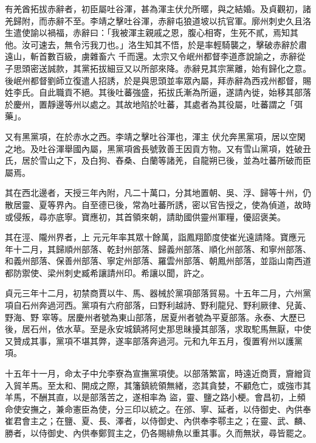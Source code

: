 \begin{pinyinscope}
 有羌酋拓拔赤辭者，初臣屬吐谷渾，甚為渾主伏允所暱，與之結婚。及貞觀初，諸羌歸附，而赤辭不至。李靖之擊吐谷渾，赤辭屯狼道坡以抗官軍。廓州刺史久且洛生遣使諭以禍福，赤辭曰：「我被渾主親戚之恩，腹心相寄，生死不貳，焉知其他。汝可速去，無令污我刀也。」洛生知其不悟，於是率輕騎襲之，擊破赤辭於肅遠山，斬首數百級，虜雜畜六
 千而還。太宗又令岷州都督李道彥說諭之，赤辭從子思頭密送誠款，其黨拓拔細豆又以所部來降。赤辭見其宗黨離，始有歸化之意。後岷州都督劉師立復遣人招誘，於是與思頭並率眾內屬，拜赤辭為西戎州都督，賜姓李氏。自此職貢不絕。其後吐蕃強盛，拓拔氏漸為所逼，遂請內徙，始移其部落於慶州，置靜邊等州以處之。其故地陷於吐蕃，其處者為其役屬，吐蕃謂之「弭藥」。



 又有黑黨項，在於赤水之西。李靖之擊吐谷渾也，渾主
 伏允奔黑黨項，居以空閑之地。及吐谷渾舉國內屬，黑黨項酋長號敦善王因貢方物。又有雪山黨項，姓破丑氏，居於雪山之下，及白狗、舂桑、白蘭等諸羌，自龍朔已後，並為吐蕃所破而臣屬焉。



 其在西北邊者，天授三年內附，凡二十萬口，分其地置朝、吳、浮、歸等十州，仍散居靈、夏等界內。自至德已後，常為吐蕃所誘，密以官告授之，使為偵道，故時或侵叛，尋亦底寧。寶應初，其首領來朝，請助國供靈州軍糧，優詔褒美。



 其在涇、隴州界者，上
 元元年率其眾十餘萬，詣鳳翔節度使崔光遠請降。寶應元年十二月，其歸順州部落、乾封州部落、歸義州部落、順化州部落、和寧州部落、和義州部落、保善州部落、寧定州部落、羅雲州部落、朝鳳州部落，並詣山南西道都防禦使、梁州刺史臧希讓請州印。希讓以聞，許之。



 貞元三年十二月，初禁商賈以牛、馬、器械於黨項部落貿易。十五年二月，六州黨項自石州奔過河西。黨項有六府部落，曰野利越詩、野利龍兒、野利厥律、兒黃、野海、野
 窣等。居慶州者號為東山部落，居夏州者號為平夏部落。永泰、大歷已後，居石州，依水草。至是永安城鎮將阿史那思昧擾其部落，求取駝馬無厭，中使又贊成其事，黨項不堪其弊，遂率部落奔過河。元和九年五月，復置宥州以護黨項。



 十五年十一月，命太子中允李寮為宣撫黨項使。以部落繁富，時遠近商賈，齎繒貨入貿羊馬。至太和、開成之際，其籓鎮統領無緒，恣其貪婪，不顧危亡，或強市其羊馬，不酬其直，以是部落苦之，遂相率為
 盜，靈、鹽之路小梗。會昌初，上頻命使安撫之，兼命憲臣為使，分三印以統之。在邠、寧、延者，以侍御史、內供奉崔君會主之；在鹽、夏、長、澤者，以侍御史、內供奉李鄠主之；在靈、武、麟、勝者，以侍御史、內供奉鄭賀主之，仍各賜緋魚以重其事。久而無狀，尋皆罷之。




\end{pinyinscope}
